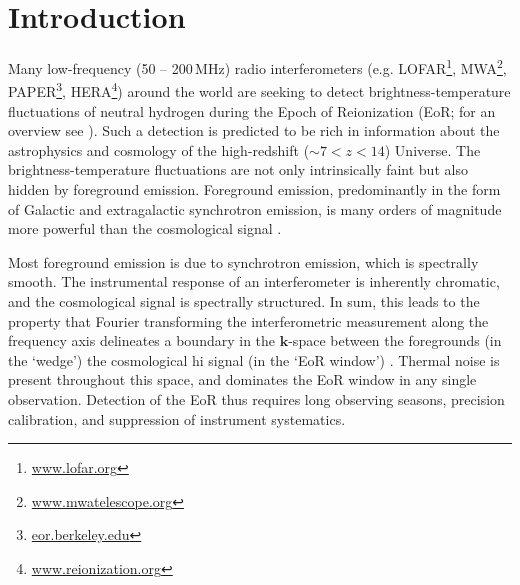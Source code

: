 \documentclass[twocolumn, trackchanges]{aastex61}
\begin{document}
\section{Introduction}
\label{sec:intro}

Many low-frequency (50 -- 200\,MHz) radio interferometers (e.g. LOFAR\footnote{\url{www.lofar.org}}, MWA\footnote{\url{www.mwatelescope.org}}, PAPER\footnote{\url{eor.berkeley.edu}}, HERA\footnote{\url{www.reionization.org}}) around the world are seeking to detect brightness-temperature fluctuations of neutral hydrogen during the Epoch of Reionization (EoR; for an overview see \citet{Furlanetto06}). 
Such a detection is predicted to be rich in information about the astrophysics and cosmology of the high-redshift ($\sim 7 < z < 14$) Universe.
The  brightness-temperature fluctuations are not only intrinsically faint but also hidden by foreground emission. Foreground emission, predominantly in the form of Galactic and extragalactic synchrotron emission, is many orders of magnitude more powerful than the cosmological signal \citep[e.g.][]{Bernardi09, Pober13, Dillon14}.

Most foreground emission is due to synchrotron emission, which is spectrally smooth. The instrumental response of an interferometer is inherently chromatic, and the cosmological signal is spectrally structured. In sum, this leads to the property that Fourier transforming the interferometric measurement along the frequency axis delineates a boundary in the $\mathbf{k}$-space between the 
foregrounds (in the `wedge')  the cosmological {\sc hi} signal (in the `EoR window')
\citep{Datta.10, Morales.12, Parsons.12a, Parsons.12b, Trott.12, Vedantham.12, Pober13, Thyagarajan.13, Pober.14, Liu.14a, Liu.14b, Dillon.15a, Dillon.15b, Nithya.15b, Nithya.15a}.
Thermal noise is present throughout this space, and dominates the EoR window in any single observation.
Detection of the EoR thus requires long observing seasons, precision calibration, and suppression of instrument systematics. 

\end{document}
